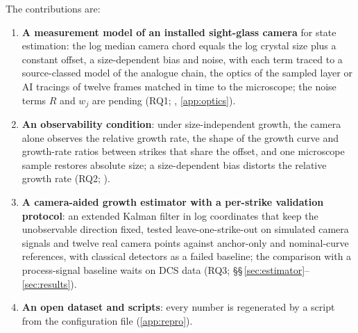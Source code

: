 The contributions are:
\begin{enumerate}
\item \textbf{A measurement model of an installed sight-glass camera} for state estimation: the log median camera
chord equals the log crystal size plus a constant offset, a size-dependent bias and noise, with each term traced to
a source-classed model of the analogue chain, the optics of the sampled layer or AI tracings of twelve frames matched
in time to the microscope; the noise terms $R$ and $w_j$ are pending (RQ1; ,
\ref{app:optics}).
\item \textbf{An observability condition}: under size-independent growth, the camera alone observes the relative
growth rate, the shape of the growth curve and growth-rate ratios between strikes that share the offset, and one
microscope sample restores absolute size; a size-dependent bias distorts the relative growth rate (RQ2;
).
\item \textbf{A camera-aided growth estimator with a per-strike validation protocol}: an extended Kalman filter in log
coordinates that keep the unobservable direction fixed, tested leave-one-strike-out on simulated camera signals and
twelve real camera points against anchor-only and nominal-curve references, with classical detectors as a failed
baseline; the comparison with a process-signal baseline waits on DCS data (RQ3;
\S\S\,\ref{sec:estimator}--\ref{sec:results}).
\item \textbf{An open dataset and scripts}: every number is regenerated by a script from the configuration file
(\ref{app:repro}).
\end{enumerate}
